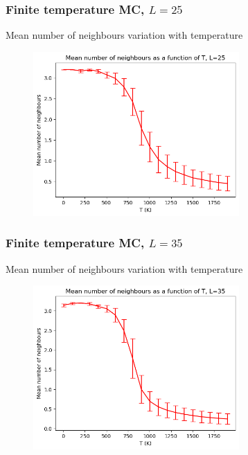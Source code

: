 \documentclass{beamer}
\begin{document}
\begin{frame}
    \frametitle{Finite temperature MC, $L=25$}

    \centering Mean number of neighbours variation with temperature

    \begin{figure}
        \includegraphics[width=0.7\textwidth]{images/nn15.png}
    \end{figure}

\end{frame}

\begin{frame}
    \frametitle{Finite temperature MC, $L=35$}

    \centering Mean number of neighbours variation with temperature

    \begin{figure}
        \includegraphics[width=0.7\textwidth]{images/nn35.png}
    \end{figure}

\end{frame}
\end{document}
